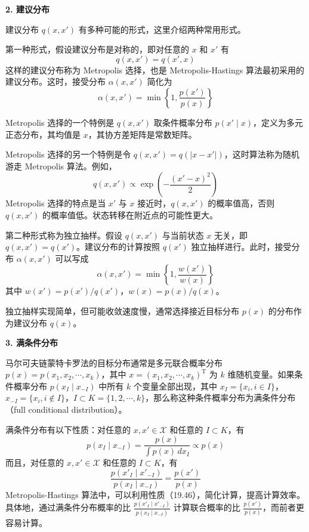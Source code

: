 \documentclass[UTF8, 12pt, fontset=fandol, oneside]{ctexart}
\begin{document}
\noindent\textbf{2. 建议分布}

建议分布 $q(x,x')$ 有多种可能的形式，这里介绍两种常用形式。

第一种形式，假设建议分布是对称的，即对任意的 $x$ 和 $x'$ 有
\begin{equation}
q(x,x')=q(x',x)
\tag{19.42}
\end{equation}
这样的建议分布称为 Metropolis 选择，也是 Metropolis-Hastings 算法最初采用的建议分布。这时，接受分布 $\alpha(x,x')$ 简化为
\begin{equation}
\alpha(x,x')=\min\left\{1,\frac{p(x')}{p(x)}\right\}
\tag{19.43}
\end{equation}

Metropolis 选择的一个特例是 $q(x,x')$ 取条件概率分布 $p(x'\mid x)$，定义为多元正态分布，其均值是 $x$，其协方差矩阵是常数矩阵。

Metropolis 选择的另一个特例是令 $q(x,x')=q(|x-x'|)$，这时算法称为随机游走 Metropolis 算法。例如，
\[
q(x,x')\propto \exp\left(-\frac{(x'-x)^2}{2}\right)
\]
Metropolis 选择的特点是当 $x'$ 与 $x$ 接近时，$q(x,x')$ 的概率值高，否则 $q(x,x')$ 的概率值低。状态转移在附近点的可能性更大。

第二种形式称为独立抽样。假设 $q(x,x')$ 与当前状态 $x$ 无关，即 $q(x,x')=q(x')$。建议分布的计算按照 $q(x')$ 独立抽样进行。此时，接受分布 $\alpha(x,x')$ 可以写成
\begin{equation}
\alpha(x,x')=\min\left\{1,\frac{w(x')}{w(x)}\right\}
\tag{19.44}
\end{equation}
其中 $w(x')=p(x')/q(x')$，$w(x)=p(x)/q(x)$。

独立抽样实现简单，但可能收敛速度慢，通常选择接近目标分布 $p(x)$ 的分布作为建议分布 $q(x)$。

\noindent\textbf{3. 满条件分布}

马尔可夫链蒙特卡罗法的目标分布通常是多元联合概率分布 $p(x)=p(x_1,x_2,\cdots,x_k)$，其中 $x=(x_1,x_2,\cdots,x_k)^{\mathrm{T}}$ 为 $k$ 维随机变量。如果条件概率分布 $p(x_I\mid x_{-I})$ 中所有 $k$ 个变量全部出现，其中 $x_I=\{x_i,i\in I\}$，$x_{-I}=\{x_i,i\notin I\}$，$I\subset K=\{1,2,\cdots,k\}$，那么称这种条件概率分布为满条件分布（full conditional distribution）。

满条件分布有以下性质：对任意的 $x,x'\in\mathcal{X}$ 和任意的 $I\subset K$，有
\begin{equation}
p(x_I\mid x_{-I})=\frac{p(x)}{\displaystyle\int p(x)\,dx_I}\propto p(x)
\tag{19.45}
\end{equation}
而且，对任意的 $x,x'\in\mathcal{X}$ 和任意的 $I\subset K$，有
\begin{equation}
\frac{p(x'_I\mid x'_{-I})}{p(x_I\mid x_{-I})}=\frac{p(x')}{p(x)}
\tag{19.46}
\end{equation}
Metropolis-Hastings 算法中，可以利用性质（19.46），简化计算，提高计算效率。具体地，通过满条件分布概率的比 $\frac{p(x'_I\mid x'_{-I})}{p(x_I\mid x_{-I})}$ 计算联合概率的比 $\frac{p(x')}{p(x)}$，而前者更容易计算。
\end{document}
